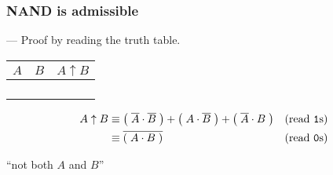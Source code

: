 \begin{frame}

\frametitle{NAND is admissible}

\begin{flushright}
--- Proof by reading the truth table.
\end{flushright}

\begin{center}

\begin{tabular}{cc|>{\centering\arraybackslash}p{0.4in}}
$A$ & $B$ & $A \uparrow B$ \\\hline
\bz{} & \bz{} & \bo{} \\
\bz{} & \bo{} & \bo{} \\
\bo{} & \bz{} & \bo{} \\
\bo{} & \bo{} & \bz{}
\end{tabular}

\begin{minipage}[t][0.9in]{\textwidth}
\begin{align*}
A \uparrow B %
&\equiv \p{\overline{A} \cdot \overline{B}} + \p{A \cdot \overline{B}} + \p{\overline{A} \cdot B} %
& \text{(read \texttt{1}s)}\\
&\equiv \overline{\p{A\cdot B}} & \text{(read \texttt{0}s)}
\end{align*}
\end{minipage}

``not both $A$ and $B$''

\end{center}

\end{frame}

